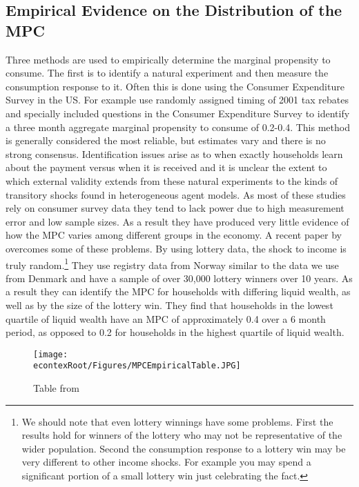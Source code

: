 \documentclass[titlepage]{\econtex}\newcommand{\texname}{IncomeUncertainty}
\begin{document}
\subsection{Empirical Evidence on the Distribution of the MPC}
Three methods are used to empirically determine the marginal propensity to consume. The first is to identify a natural experiment and then measure the consumption response to it. Often this is done using the Consumer Expenditure Survey in the US. For example \cite{johnson_household_2006} use randomly assigned timing of 2001 tax rebates and specially included questions in the Consumer Expenditure Survey to identify a three month aggregate marginal propensity to consume of 0.2-0.4. This method is generally considered the most reliable, but estimates vary and there is no strong consensus. Identification issues arise as to when exactly households learn about the payment versus when it is received and it is unclear the extent to which external validity extends from these natural experiments to the kinds of transitory shocks found in heterogeneous agent models. As most of these studies rely on consumer survey data they tend to lack power due to high measurement error and low sample sizes. As a result they have produced very little evidence of how the MPC varies among different groups in the economy. A recent paper by \cite{fagereng_mpc_2016} overcomes some of these problems. By using lottery data, the shock to income is truly random.\footnote{We should note that even lottery winnings have some problems. First the results hold for winners of the lottery who may not be representative of the wider population. Second the consumption response to a lottery win may be very different to other income shocks. For example you may spend a significant portion of a small lottery win just celebrating the fact.} They use registry data from Norway similar to the data we use from Denmark and have a sample of over 30,000 lottery winners over 10 years. As a result they can identify the MPC for households with differing liquid wealth, as well as by the size of the lottery win. They find that households in the lowest quartile of liquid wealth have an MPC of approximately 0.4 over a 6 month period, as opposed to 0.2 for households in the highest quartile of liquid wealth.
	\begin{figure} 
	\begin{centering}
		\texttt{[image: \\econtexRoot/Figures/MPCEmpiricalTable.JPG]}
		\caption{Table from \cite{carroll_distribution_2016}}
		\label{fig:MPCtable}
	\end{centering}
\end{figure}
\end{document}
